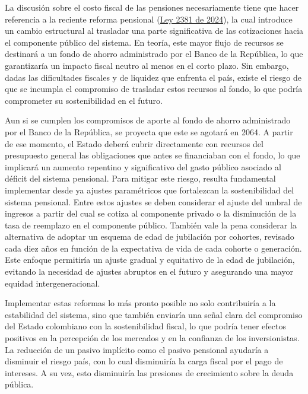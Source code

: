 La discusión sobre el costo fiscal de las pensiones necesariamente tiene que hacer referencia a la reciente reforma pensional (\href{https://www.funcionpublica.gov.co/eva/gestornormativo/norma.php?i=246356}{Ley 2381 de 2024}), la cual introduce un cambio estructural al trasladar una parte significativa de las cotizaciones hacia el componente público del sistema. En teoría, este mayor flujo de recursos se destinará a un fondo de ahorro administrado por el Banco de la República, lo que garantizaría un impacto fiscal neutro al menos en el corto plazo. Sin embargo, dadas las dificultades fiscales y de liquidez que enfrenta el país, existe el riesgo de que se incumpla el compromiso de trasladar estos recursos al fondo, lo que podría comprometer su sostenibilidad en el futuro.

Aun si se cumplen los compromisos de aporte al fondo de ahorro administrado por el Banco de la República, se proyecta que este se agotará en 2064. A partir de ese momento, el Estado deberá cubrir directamente con recursos del presupuesto general las obligaciones que antes se financiaban con el fondo, lo que implicará un aumento repentino y significativo del gasto público asociado al déficit del sistema pensional. Para mitigar este riesgo, resulta fundamental implementar desde ya ajustes paramétricos que fortalezcan la sostenibilidad del sistema pensional. Entre estos ajustes se deben considerar el ajuste del umbral de ingresos a partir del cual se cotiza al componente privado o la disminución de la tasa de reemplazo en el componente público. También vale la pena considerar la alternativa de adoptar un esquema de edad de jubilación por cohortes, revisado cada diez años en función de la expectativa de vida de cada cohorte o generación. Este enfoque permitiría un ajuste gradual y equitativo de la edad de jubilación, evitando la necesidad de ajustes abruptos en el futuro y asegurando una mayor equidad intergeneracional. 

Implementar estas reformas lo más pronto posible no solo contribuiría a la estabilidad del sistema, sino que también enviaría una señal clara del compromiso del Estado colombiano con la sostenibilidad fiscal, lo que podría tener efectos positivos en la percepción de los mercados y en la confianza de los inversionistas. La reducción de un pasivo implícito como el pasivo pensional ayudaría a disminuir el riesgo país, con lo cual disminuiría la carga fiscal por el pago de intereses. A su vez, esto disminuiría las presiones de crecimiento sobre la deuda pública.

